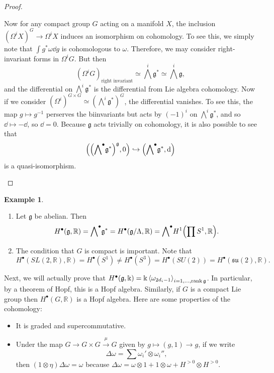 \documentclass[leqno, openany]{memoir}
\theoremstyle{definition}
\newtheorem{exm}[thm]{Example}
\theoremstyle{remark}
\theoremstyle{plain}
\theoremstyle{definition}
\theoremstyle{remark}
\newcommand{\R}{\mathbb{R}}
\renewcommand{\k}{\Bbbk}
\newcommand{\mf}[1]{\mathfrak{#1}}
\begin{document}
\begin{proof}
\begin{enumerate}
            Now for any compact group $G$ acting on a manifold $X$, the
            inclusion ${(\Omega^i X)}^G \to \Omega^i X$ induces an isomorphism
            on cohomology. To see this, we simply note that $\int g^* \omega
            \dd{g}$ is cohomologous to $\omega$. Therefore, we may consider
            right-invariant forms in $\Omega^i G$. But then \[ {(\Omega^i
            G)}_{\text{right invariant}} \simeq {\bigwedge}^i \mf{g}^* \simeq
        {\bigwedge}^i \mf{g}, \] and the differential on $\bigwedge^i \mf{g}^*$
        is the differential from Lie algebra cohomology. Now if we consider
        ${(\Omega^i)}^{G \times G} \simeq {(\bigwedge^i \mf{g}^*)}^G$, the
        differential vanishes. To see this, the map $g \mapsto g^{-1}$
        perserves the biinvariants but acts by ${(-1)}^i$ on $\bigwedge^i
        \mf{g}^*$, and so $\dd \mapsto -\dd$, so $\dd = 0$. Because $\mf{g}$
        acts trivially on cohomology, it is also possible to see that \[ \qty(
    {\qty({\bigwedge}^{\bullet} \mf{g}^*)}^{\mf{g}}, 0 ) \hookrightarrow \qty (
    {\bigwedge}^{\bullet} \mf{g}^*, \dd ) \] is a quasi-isomorphism. \qedhere
    \end{enumerate} \end{proof}

\begin{exm} \begin{enumerate} \item Let $\mf{g}$ be abelian. Then \[
H^{\bullet}(\mf{g}, \R) = {\bigwedge}^{\bullet} \mf{g}^* =
H^{\bullet}(\mf{g}/\Lambda, \R) = {\bigwedge}^{\bullet} H^1\qty(\prod S^1, \R).
\] \item The condition that $G$ is compact is important. Note that \[
H^{\bullet}(SL(2, \R), \R) = H^{\bullet}(S^1) \neq H^{\bullet}(S^3) =
H^{\bullet}(SU(2)) = H^{\bullet}(\mf{su}(2), \R). \] \end{enumerate} \end{exm}

Next, we will actually prove that $H^{\bullet}(\mf{g}, \k) = \k
\ev{\omega_{2d_i - 1}}_{i = 1, \ldots, \rank \mf{g}}$. In particular, by a
theorem of Hopf, this is a Hopf algebra. Similarly, if $G$ is a compact Lie
group then $H^{\bullet}(G, \R)$ is a Hopf algebra. Here are some properties of
the cohomology: \begin{itemize} \item It is graded and supercommutative.  \item
    Under the map $G \to G \times G \xrightarrow{\mu} G$ given by $g \mapsto
    (g, 1) \to g$, if we write \[ \Delta \omega = \sum \omega_i' \otimes
    \omega_i'', \] then $(1 \otimes \eta) \Delta \omega = \omega$ because
    $\Delta \omega = \omega \otimes 1 + 1 \otimes \omega + H^{>0} \otimes
    H^{>0}$.  \end{itemize}
\end{document}
